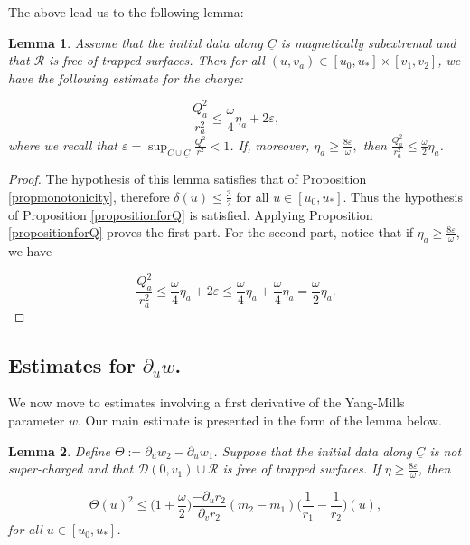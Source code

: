 \documentclass{article}[11pt]
\newcommand{\Cbar}{\underline{C}}
\newtheorem{lemma}{Lemma}[section]
\numberwithin{equation}{section}
\begin{document}
\noindent The above lead us to the following lemma:

\begin{lemma} \label{lemmaomegaeta}
Assume that the initial data along $\Cbar$ is magnetically subextremal and that $\mathcal{R}$ is free of trapped surfaces. Then for all $(u,v_a) \in [u_0, u_*] \times [v_1,v_2]$, we have the following estimate for the charge:

\[  \frac{Q_a^2}{r_a^2}\leq \frac{\omega}{4}\eta_a+2\varepsilon,  \]where we recall that $\varepsilon = \sup_{C \cup \Cbar}\frac{Q^2}{r^2} <1$. If, moreover, $\eta_a \geq \frac{8\varepsilon}{\omega},$ then $\frac{Q_a^2}{r_a^2}\leq \frac{\omega}{2}\eta_a$.
\end{lemma}

\begin{proof}
The hypothesis of this lemma satisfies that of Proposition \ref{propmonotonicity}, therefore $\delta(u) \leq \frac{3}{2}$ for all $u \in [u_0, u_*]$. Thus the hypothesis of Proposition \ref{propositionforQ} is satisfied. Applying Proposition \ref{propositionforQ} proves the first part. For the second part, notice that if $\eta_a \geq \frac{8\varepsilon}{\omega}$, we have

\[  \frac{Q_a^2}{r_a^2}\leq \frac{\omega}{4}\eta_a +2\varepsilon\leq \frac{\omega}{4}\eta_a + \frac{\omega}{4}\eta_a = \frac{\omega}{2}\eta_a.    \]
\end{proof}

\subsection{Estimates for $\partial_u w$.}\label{sectionw}
We now move to estimates involving a first derivative of the Yang-Mills parameter $w$. Our main estimate is presented in the form of the lemma below.
\begin{lemma} \label{Thetalemma}
Define $\Theta:= \partial_u w_2 - \partial_u w_1$. Suppose that the initial data along $\Cbar$ is not super-charged and that $\mathcal{D}(0,v_1)\cup \mathcal{R}$ is free of trapped surfaces. If $\eta \geq \frac{8 \varepsilon}{\omega}$, then 

\[  \Theta(u)^2 \leq \big(1 +\frac{\omega}{2}\big) \frac{- \partial_u r_2}{\partial_v r_2}(m_2-m_1)\bigg( \frac{1}{r_1}- \frac{1}{r_2}\bigg)(u),    \]for all $u \in [u_0, u_*]$.
\end{lemma}
\end{document}

